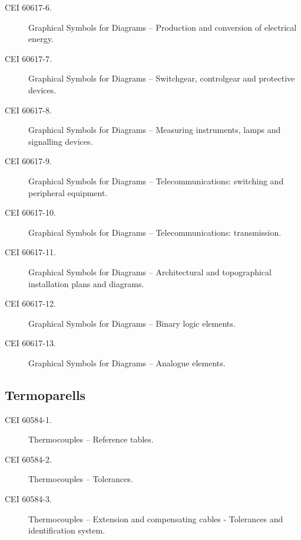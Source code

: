 \begin{description}
    \item [\hspace{5mm}CEI 60617-6.] Graphical Symbols for Diagrams -- Production and conversion of electrical energy.
    \item [\hspace{5mm}CEI 60617-7.] Graphical Symbols for Diagrams -- Switchgear, controlgear and protective devices.
     \item [\hspace{5mm}CEI 60617-8.] Graphical Symbols for Diagrams -- Measuring instruments, lamps and signalling devices.
     \item [\hspace{5mm}CEI 60617-9.] Graphical Symbols for Diagrams -- Telecommunications: switching and peripheral equipment.
      \item [\hspace{5mm}CEI 60617-10.] Graphical Symbols for Diagrams -- Telecommunications: transmission.
      \item [\hspace{5mm}CEI 60617-11.] Graphical Symbols for Diagrams -- Architectural and topographical installation plans and diagrams.
      \item [\hspace{5mm}CEI 60617-12.] Graphical Symbols for Diagrams -- Binary logic elements.
      \item [\hspace{5mm}CEI 60617-13.] Graphical Symbols for Diagrams -- Analogue elements.
\end{description}


\subsection*{Termoparells} 
\begin{description}
    \item [\hspace{5mm}CEI 60584-1.] Thermocouples -- Reference tables.
    \item [\hspace{5mm}CEI 60584-2.] Thermocouples -- Tolerances.
    \item [\hspace{5mm}CEI 60584-3.] Thermocouples -- Extension and compensating cables - Tolerances and identification system.
\end{description}


